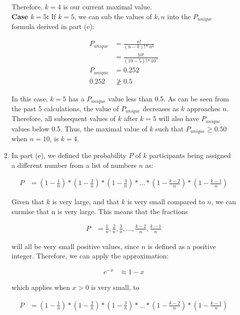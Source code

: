 \documentclass[11pt]{article}
\theoremstyle{definition}
\begin{document}
\begin{enumerate}
\begin{enumerate}
Therefore, $k = 4$ is our current maximal value.\\

\textbf{Case $k = 5$:} If $k = 5$, we can sub the values of $k, n$ into the $P_{unique}$ formula derived in part (e):

\begin{align*}
P_{unique} &= \frac{n!}{(n - k)! * n^k}\\
&= \frac{10!}{(10 - 5)! * 10^5}\\
P_{unique} &= 0.252\\
0.252 &\ngeq 0.5
\end{align*}

In this case, $k = 5$ has a $P_{unique}$ value less than 0.5. As can be seen from the past 5 calculations, the value of $P_{unique}$ decreases as $k$ approaches $n$. Therefore, all subsequent values of
$k$ after $k = 5$ will also have $P_{unique}$ values below 0.5. Thus, the maximal value of $k$ such that $P_{unique} \geq 0.50$ when $n = 10$, is $k = 4$.

\item In part (e), we defined the probability $P$ of $k$ participants being assigned a different number from a list of numbers $n$ as:

\begin{align*}
P &= (1 - \frac{1}{n}) * (1 - \frac{2}{n}) * (1 - \frac{3}{n}) * \ldots * (1 - \frac{k - 2}{n}) * (1 - \frac{k - 1}{n})
\end{align*}

Given that $k$ is very large, and that $k$ is very small compared to $n$, we can surmise that n is very large. This means that the fractions 

\begin{align*}
P &= \frac{1}{n}, \frac{2}{n}, \frac{3}{n}, \ldots, \frac{k - 2}{n}, \frac{k - 1}{n}
\end{align*}

will all be very small positive values, since $n$ is defined as a positive integer. Therefore, we can apply the approximation:

\begin{align*}
e^{-x} &\approx 1 - x
\end{align*}

which applies when $x > 0$ is very small, to

\begin{align*}
P &= (1 - \frac{1}{n}) * (1 - \frac{2}{n}) * (1 - \frac{3}{n}) * \ldots * (1 - \frac{k - 2}{n}) * (1 - \frac{k - 1}{n})
\end{align*}


\end{enumerate}
\end{enumerate}
\end{document}
